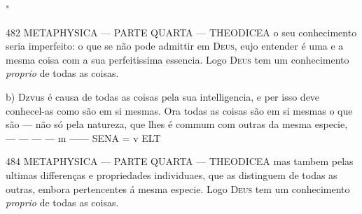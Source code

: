  "

482 METAPHYSICA --- PARTE QUARTA --- THEODICEA o seu conhecimento seria imperfeito: o que se não pode admittir em \textsc{Deus}, eujo entender é uma e a mesma coisa com a sua perfeitissima essencia. Logo \textsc{Deus} tem um conhecimento \emph{proprio} de todas as coisas.

b) Dzvus é causa de todas as coisas pela sua intelligencia, e per isso deve conhecel-as como são em si mesmas. Ora todas as coisas são em si mesmas o que são --- não só pela natureza, que lhes é commum com outras da mesma especie, ---    --- --- --- m ------ SENA = v ELT

484 METAPHYSICA --- PARTE QUARTA --- THEODICEA mas tambem pelas ultimas differenças e propriedades individuaes, que as distinguem de todas as outras, embora pertencentes á mesma especie. Logo \textsc{Deus} tem um conhecimento \emph{proprio} de todas as coisas.

